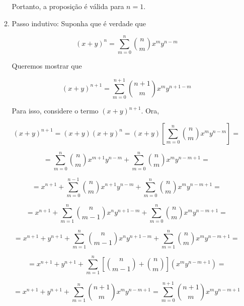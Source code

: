 \documentclass{article}
\begin{document}
\begin{enumerate}
\begin{enumerate}[itemsep=0pt, label=(\roman*)]
    Portanto, a proposição é válida para $n=1$. 
    
    
    \item Passo indutivo: Suponha que é verdade que 
    
    \begin{equation} \label{ind:7-hip-ind}
        (x+y)^{n}=\sum_{m=0}^{n}{n \choose m} x^{m} y^{n-m}
    \end{equation}
    
    Queremos mostrar que
    
    $$
    (x+y)^{n+1}=\sum_{m=0}^{n+1}{n+1 \choose m}x^{m} y^{n+1-m}
    $$
    
    Para isso, considere o termo $(x+y)^{n+1}$. Ora,
    
    \begin{equation*}
    (x+y)^{n+1}=(x+y)(x+y)^{n} = (x+y)\left[\sum_{m=0}^{n}{n \choose m} x^{m} y^{n-m}\right] = 
    \end{equation*}
    
    \begin{equation*}
        = \sum_{m=0}^{n}{n \choose m} x^{m+1} y^{n-m}+\sum_{m=0}^{n}{n \choose m} x^{m} y^{n-m+1} = 
    \end{equation*}
    
    \begin{equation*}
        = x^{n+1} + \sum_{m=0}^{n-1}{n \choose m} x^{n+1} y^{n-m}+\sum_{m=0}^{n}{n \choose m} x^{m} y^{n-m+1} = 
    \end{equation*}
    
    \begin{equation*}
        = x^{n+1} + \sum_{m=1}^{n}{n \choose m-1} x^{n} y^{n+1-m}+\sum_{m=0}^{n}{n \choose m} x^{m} y^{n-m+1} = 
    \end{equation*}
    
    \begin{equation*}
        = x^{n+1} +y^{n+1} + \sum_{m=1}^{n}{n \choose m-1} x^{n} y^{n+1-m}+\sum_{m=1}^{n}{n \choose m} x^{m} y^{n-m+1} = 
    \end{equation*}
    
    \begin{equation*}
        = x^{n+1} +y^{n+1} + \sum_{m=1}^{n} \left[{n \choose m-1} + {n \choose m}\right] (x^{m}y^{n-m+1}) = 
    \end{equation*}
    
    \begin{equation} \label{ind:7-ind}
        = x^{n+1} +y^{n+1} + \sum_{m=1}^{n} {n+1 \choose m} x^{m}y^{n-m+1} = \sum_{m=0}^{n+1} {n+1 \choose m} x^{m}y^{n-m+1}
    \end{equation}
    

\end{enumerate}
\end{enumerate}
\end{document}
